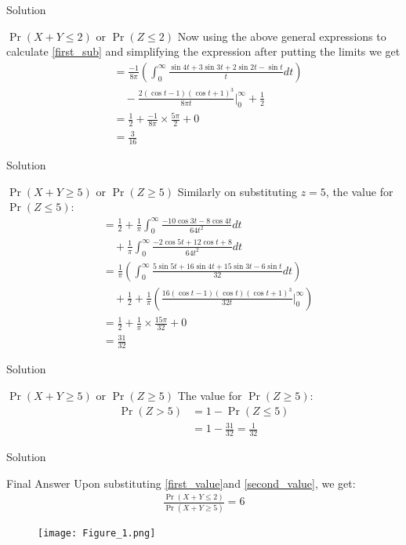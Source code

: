 \documentclass{beamer}
\providecommand{\pr}[1]{\ensuremath{\Pr\left(#1\right)}}
\begin{document}
\begin{frame}{Solution}
    \begin{block}{$\pr{X+Y \leq 2}$ or $\pr{Z\leq 2}$}
    Now using the above general expressions to calculate \eqref{first_sub} and simplifying the expression after putting the limits we get
\begin{align}
\nonumber
    &=\frac{-1}{8\pi}\left(\int_0^\infty\frac{\sin{4t}+3\sin{3t}+2\sin{2t}-\sin{t}}{t}dt\right)\\
    &\quad -\frac{2(\cos{t}-1)(\cos{t}+1)^3}{8\pi t}\bigg|_0^\infty+\frac{1}{2}\\
    &=\frac{1}{2} + \frac{-1}{8\pi}\times \frac{5\pi}{2}+0\\
    &=\frac{3}{16}\label{first_value}
\end{align}
    \end{block}
\end{frame}
\begin{frame}{Solution}
    \begin{block}{$\pr{X+Y\geq 5}$ or $\pr{Z\geq 5}$}
    Similarly on substituting $z=5$, the value for $\pr{Z\leq 5}$:
\begin{align}
\nonumber
    &=\frac{1}{2} +\frac{1}{\pi}\int_0^\infty\frac{-10\cos{3t}-8\cos{4t}}{64t^2}dt\\&\quad +\frac{1}{\pi}\int_0^\infty\frac{-2\cos{5t}+12\cos{t}+8}{64t^2}dt\\ \nonumber
    &=\frac{1}{\pi}\left(\int_0^\infty\frac{5\sin{5t}+16\sin{4t}+15\sin{3t}-6\sin{t}}{32}dt\right)\\
    &\quad+\frac{1}{2}+\frac{1}{\pi}\left(\frac{16(\cos{t}-1)(\cos{t})(\cos{t}+1)^3}{32t}\bigg|_0^\infty\right)\\
    &=\frac{1}{2}+\frac{1}{\pi}\times\frac{15\pi}{32} + 0\\
    &=\frac{31}{32}
\end{align}
    \end{block}
\end{frame}
\begin{frame}{Solution}
\begin{block}{$\pr{X+Y\geq 5}$ or $\pr{Z\geq 5}$}
The value for $\pr{Z\geq 5}$:
\begin{align}
    \pr{Z>5}&=1-\pr{Z\leq 5}\\
    &=1-\frac{31}{32}=\frac{1}{32}\label{second_value}
\end{align}
\end{block}
\end{frame}
\begin{frame}{Solution}
\begin{block}{Final Answer}
Upon substituting \eqref{first_value}and \eqref{second_value}, we get:
\begin{align}
    \frac{\pr{X+Y \leq 2}}{\pr{X+Y \geq 5}} = 6
\end{align}
\begin{figure}[h]
    \centering
    \texttt{[image: Figure\_1.png]}
    \caption{}
    \label{fig:my_label}
\end{figure}
\end{block}
    
\end{frame}
\end{document}
